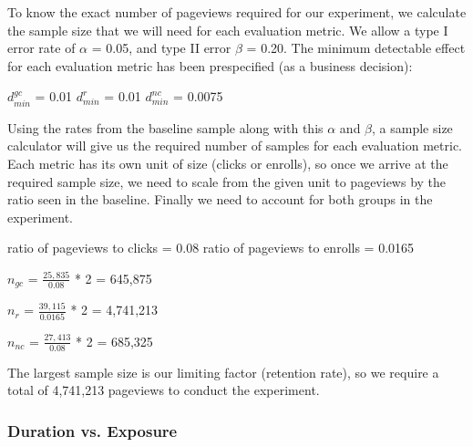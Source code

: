 \documentclass[paper=a4, fontsize=11pt]{scrartcl} %
\numberwithin{equation}{section} %
\numberwithin{figure}{section} %
\numberwithin{table}{section} %
\begin{document}

To know the exact number of pageviews required for our experiment, we calculate the sample size that we will need for each evaluation metric.  We allow a type I error rate of $\alpha$ = 0.05, and type II error $\beta$ = 0.20.  The minimum detectable effect for each evaluation metric has been prespecified (as a business decision): \newline

$d_{min}^{gc}$ = 0.01\quad
$d_{min}^{r}$ = 0.01\quad
$d_{min}^{nc}$ = 0.0075
\newline

Using the rates from the baseline sample along with this $\alpha$ and $\beta$, a sample size calculator
will give us the required number of samples for each evaluation metric.  Each metric has it\textquotesingle s own unit of size (clicks or enrolls), so once we arrive at the required sample size, we need to scale from the given unit to pageviews by the ratio seen in the baseline.  Finally we need to account for both groups in the experiment. \newline

ratio of pageviews to clicks = 0.08 \newline
ratio of pageviews to enrolls = 0.0165 \newline

$n_{gc}$ = $\frac{25,835}{0.08}$ * 2 = 645,875 \newline

$n_{r}$ = $\frac{39,115}{0.0165}$ * 2 = 4,741,213 \newline

$n_{nc}$ = $\frac{27,413}{0.08}$ * 2 = 685,325
\newline

The largest sample size is our limiting factor (retention rate), so we require a total of 4,741,213 pageviews to conduct the experiment. \newline


\subsubsection{Duration vs. Exposure}

\end{document}
